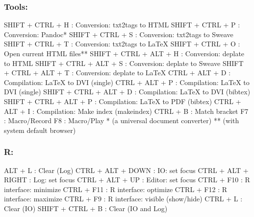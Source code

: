 \newpage
\subsubsection{Tools:}

\vspace{-0.5cm}
\begin{Rtables}[caption={[Tools menu keyboard shortcuts]
    ToolsMenu keyboard shortcuts},
  label=menu:tools]
  SHIFT + CTRL + H        : Conversion: txt2tags to HTML
  SHIFT + CTRL + P        : Conversion: Pandoc*
  SHIFT + CTRL + S        : Conversion: txt2tags to Sweave
  SHIFT + CTRL + T        : Conversion: txt2tags to LaTeX
  SHIFT + CTRL + O        : Open current HTML files**
  SHIFT + CTRL + ALT + H  : Conversion: deplate to HTML
  SHIFT + CTRL + ALT + S  : Conversion: deplate to Sweave
  SHIFT + CTRL + ALT + T  : Conversion: deplate to LaTeX
  CTRL  + ALT  + D        : Compilation: LaTeX to DVI (single)
  CTRL  + ALT  + P        : Compilation: LaTeX to DVI (single)
  SHIFT + CTRL + ALT + D  : Compilation: LaTeX to DVI (bibtex)
  SHIFT + CTRL + ALT + P  : Compilation: LaTeX to PDF (bibtex)
  CTRL  + ALT  + I        : Compilation: Make index (makeindex)
  CTRL  + B               : Match bracket
  F7                      : Macro/Record
  F8                      : Macro/Play
  *  (a universal document converter)
  ** (with system default browser)
\end{Rtables}


\subsubsection{R:}

\vspace{-0.5cm}
\begin{Rtables}[caption={[R menu keyboard shortcuts]
    R menu keyboard shortcuts},
  label=menu:r]
  ALT  + L               : Clear (Log)
  CTRL + ALT + DOWN      : IO: set focus
  CTRL + ALT + RIGHT     : Log: set focus
  CTRL + ALT + UP        : Editor: set focus
  CTRL + F10             : R interface: minimize
  CTRL + F11             : R interface: optimize
  CTRL + F12             : R interface: maximize
  CTRL + F9              : R interface: visible (show/hide)
  CTRL + L               : Clear (IO)
  SHIFT + CTRL + B       : Clear (IO and Log)
\end{Rtables}


